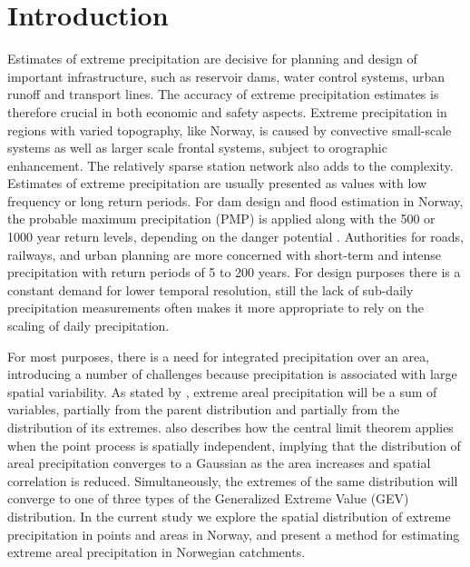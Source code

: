 \documentclass[12pt,a4paper,english]{article}
\begin{document}
\vspace{10mm}

\section{Introduction}

Estimates of extreme precipitation are decisive for planning and design of important infrastructure, such as reservoir dams, water control systems, urban runoff and transport lines. The accuracy of extreme precipitation estimates is therefore crucial in both economic and safety aspects. Extreme precipitation in regions with varied topography, like Norway, is caused by convective small-scale systems as well as larger scale frontal systems, subject to orographic enhancement. The relatively sparse station network also adds to the complexity. Estimates of extreme precipitation are usually presented as values with low frequency or long return periods. For dam design and flood estimation in Norway, the probable maximum precipitation (PMP) is applied along with the 500 or 1000 year return levels, depending on the danger potential \citep{NVE2011b}. Authorities for roads, railways, and urban planning are more concerned with short-term and intense precipitation with return periods of 5 to 200 years. For design purposes there is a constant demand for lower temporal resolution, still the lack of sub-daily precipitation measurements often makes it more appropriate to rely on the scaling of daily precipitation.

For most purposes, there is a need for integrated precipitation over an area, introducing a number of challenges because precipitation is associated with large spatial variability. As stated by \cite{Skaugenetal1996}, extreme areal precipitation will be a sum of variables, partially from the parent distribution and partially from the distribution of its extremes. \cite{Skaugenetal1996} also describes how the central limit theorem applies when the point process is spatially independent, implying that the distribution of areal precipitation converges to a Gaussian as the area increases and spatial correlation is reduced. Simultaneously, the extremes of the same distribution will converge to one of three types of the Generalized Extreme Value (GEV) distribution. In the current study we explore the spatial distribution of extreme precipitation in points and areas in Norway, and present a method for estimating extreme areal precipitation in Norwegian catchments.
\end{document}

